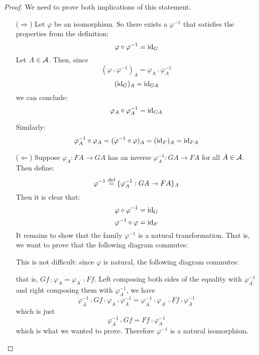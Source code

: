 \begin{proof}
We need to prove both implications of this statement.

\begin{itemize}

\item[($\Rightarrow$)] Let $\varphi$ be an isomorphism. So there exists a
$\varphi^{-1}$ that satisfies the properties from the definition:
\[ \varphi \circ \varphi^{-1} = \mathrm{id}_{ G } \]
Let $A \in \mathcal{A}$. Then, since
\[ (\varphi \comp \varphi^{-1})_A = \varphi_A \comp \varphi_A^{-1} \]
\[ ( \mathrm{id}_{ G } )_A = \mathrm{id}_{ GA } \]
we can conclude:
\[ \varphi_A \circ \varphi_A^{-1} = \mathrm{id}_{ GA } \]

Similarly:
\[ \varphi_A^{-1} \circ \varphi_A = (\varphi^{-1} \circ \varphi)_A = (\mathrm{id}_{ F })_A
= \mathrm{id}_{ FA } \]

\item[($\Leftarrow$)] Suppose $\varphi_A: FA \to GA$ has an inverse
$\varphi_A^{-1}: GA \to FA$ for all $A \in \mathcal{A}$. Then define:
\[ \varphi^{-1} \stackrel{\text{def}}{=} \{ \varphi_A^{-1}: GA \to FA \}_A \]
Then it is clear that:
\[ \varphi \circ \varphi^{-1} = \mathrm{id}_{ G } \]
\[ \varphi^{-1} \circ \varphi = \mathrm{id}_{ F } \]
It remains to show that the family $\varphi^{-1}$ is a natural transformation.
That is, we want to prove that the following diagram commutes:

\begin{center}
\end{center}

This is not difficult: since $\varphi$ is natural, the following diagram
commutes:
\begin{center}
\end{center}
that is, $Gf \comp \varphi_A = \varphi_{A^{\prime}} \comp Ff$. Left composing
both sides of the equality with $\varphi_{A^{\prime}}^{-1}$ and right composing
them with $\varphi_{A}^{-1}$, we have
\[ \varphi_{A^{\prime}}^{-1} \comp Gf \comp \varphi_A \comp \varphi_A^{-1} =
\varphi_{A^{\prime}}^{-1} \comp \varphi_{A^{\prime}} \comp Ff
\comp \varphi_A^{-1} \]
which is just
\[ \varphi_{A^{\prime}}^{-1} \comp Gf = Ff \comp \varphi_A^{-1} \]
which is what we wanted to prove. Therefore $\varphi^{-1}$ is a natural
isomorphism.

\end{itemize}
\end{proof}

